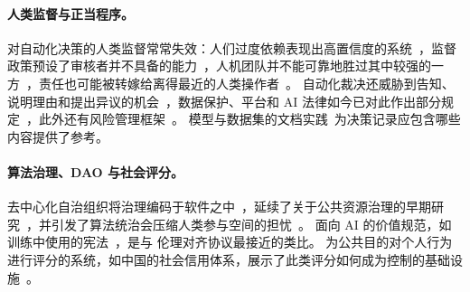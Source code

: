 \paragraph{人类监督与正当程序。}
对自动化决策的人类监督常常失效：人们过度依赖表现出高置信度的系统~\cite{parasuraman2010complacency}，监督政策预设了审核者并不具备的能力~\cite{green2022flaws,green2019principles}，人机团队并不能可靠地胜过其中较强的一方~\cite{bansal2021whole}，责任也可能被转嫁给离得最近的人类操作者~\cite{elish2019moral}。
自动化裁决还威胁到告知、说明理由和提出异议的机会~\cite{citron2008technological,wachter2018counterfactual,doshivelez2017towards}，数据保护、平台和 AI 法律如今已对此作出部分规定~\cite{gdpr2016,dsa2022,euaiact2024,santaclara2021}，此外还有风险管理框架~\cite{nist2023airmf}。
模型与数据集的文档实践~\cite{mitchell2019model,gebru2021datasheets}为决策记录应包含哪些内容提供了参考。

\paragraph{算法治理、DAO 与社会评分。}
去中心化自治组织将治理编码于软件之中~\cite{buterin2014ethereum,hassan2021decentralized,santana2022blockchain}，延续了关于公共资源治理的早期研究~\cite{ostrom1990governing}，并引发了算法统治会压缩人类参与空间的担忧~\cite{danaher2016threat}。
面向 AI 的价值规范，如训练中使用的宪法~\cite{bai2022constitutional}，是与 \pol{} 伦理对齐协议最接近的类比。
为公共目的对个人行为进行评分的系统，如中国的社会信用体系，展示了此类评分如何成为控制的基础设施~\cite{creemers2018social,liang2018constructing}。
